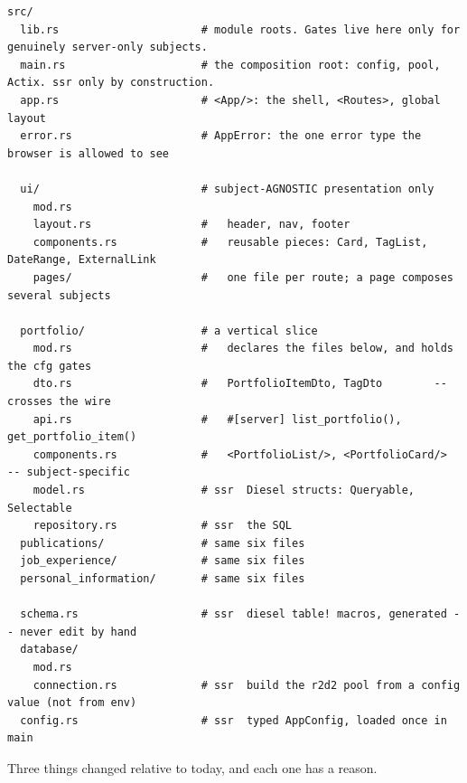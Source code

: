\begin{lstlisting}[style=tree,caption={The target module tree. \textcolor{rust}{\emph{ssr}} marks
files compiled only into the server; everything else is compiled into both programs.}]
src/
  lib.rs                      # module roots. Gates live here only for genuinely server-only subjects.
  main.rs                     # the composition root: config, pool, Actix. ssr only by construction.
  app.rs                      # <App/>: the shell, <Routes>, global layout
  error.rs                    # AppError: the one error type the browser is allowed to see

  ui/                         # subject-AGNOSTIC presentation only
    mod.rs
    layout.rs                 #   header, nav, footer
    components.rs             #   reusable pieces: Card, TagList, DateRange, ExternalLink
    pages/                    #   one file per route; a page composes several subjects

  portfolio/                  # a vertical slice
    mod.rs                    #   declares the files below, and holds the cfg gates
    dto.rs                    #   PortfolioItemDto, TagDto        -- crosses the wire
    api.rs                    #   #[server] list_portfolio(), get_portfolio_item()
    components.rs             #   <PortfolioList/>, <PortfolioCard/>  -- subject-specific
    model.rs                  # ssr  Diesel structs: Queryable, Selectable
    repository.rs             # ssr  the SQL
  publications/               # same six files
  job_experience/             # same six files
  personal_information/       # same six files

  schema.rs                   # ssr  diesel table! macros, generated -- never edit by hand
  database/
    mod.rs
    connection.rs             # ssr  build the r2d2 pool from a config value (not from env)
  config.rs                   # ssr  typed AppConfig, loaded once in main
\end{lstlisting}

Three things changed relative to today, and each one has a reason.

